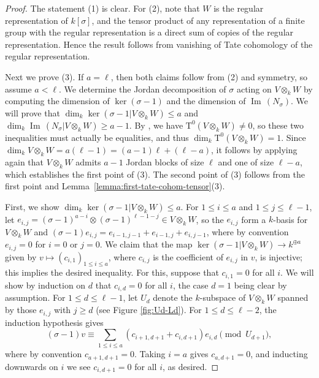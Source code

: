 \documentclass[reqno]{amsart}
\numberwithin{equation}{subsection}
\DeclareMathOperator{\Ima}{Im\,}
\newcommand{\rT}{\ensuremath{\mathrm{T}}\xspace}
\theoremstyle{remark}
\numberwithin{equation}{subsection}
\numberwithin{figure}{subsection}
\begin{document}
\begin{proof}
The statement (1) is clear. For (2), note that $W$ is the regular representation of $k[\sigma]$, and the tensor product of any representation of a finite group with the regular representation is a direct sum of copies of the regular representation. Hence the result follows from vanishing of Tate cohomology of the regular representation. 

Next we prove (3). If $a = \ell$, then both claims follow from (2) and symmetry, so assume $a < \ell$. We determine the Jordan decomposition of $\sigma$ acting on $V \otimes_k W$ by computing the dimension of $\ker(\sigma-1)$ and the dimension of $\Ima(N_\sigma)$. We will prove that $\dim_k \ker(\sigma-1| V \otimes_k W) \leq a$ and $\dim_k \Ima(N_\sigma|V \otimes_k W) \geq a-1$. By \cite[Lemma~3.1.3]{Cot26b}, we have $\rT^0(V \otimes_k W) \neq 0$, so these two inequalities must actually be equalities, and thus $\dim_k \rT^0(V \otimes_k W) = 1$. Since $\dim_k V \otimes_k W = a(\ell-1) = (a-1)\ell + (\ell-a)$, it follows by applying \cite[Lemma~3.1.3]{Cot26b} again that $V \otimes_k W$ admits $a-1$ Jordan blocks of size $\ell$ and one of size $\ell-a$, which establishes the first point of (3). The second point of (3) follows from the first point and Lemma~\ref{lemma:first-tate-cohom-tensor}(3).

First, we show $\dim_k \ker(\sigma-1| V \otimes_k W) \leq a$. For $1 \leq i \leq a$ and $1 \leq j \leq \ell-1$, let $e_{i,j} = (\sigma-1)^{a-i} \otimes (\sigma-1)^{\ell - 1-j} \in V \otimes_k W$, so the $e_{i,j}$ form a $k$-basis for $V \otimes_k W$ and $(\sigma - 1)e_{i,j} = e_{i-1,j-1} + e_{i-1,j} + e_{i,j-1}$, where by convention $e_{i,j} = 0$ for $i = 0$ or $j = 0$. We claim that the map $\ker(\sigma-1|V \otimes_k W) \to k^{\oplus a}$ given by $v \mapsto (c_{i,1})_{1 \leq i \leq a}$, where $c_{i,j}$ is the coefficient of $e_{i,j}$ in $v$, is injective; this implies the desired inequality. For this, suppose that $c_{i,1} = 0$ for all $i$. We will show by induction on $d$ that $c_{i,d} = 0$ for all $i$, the case $d=1$ being clear by assumption. For $1 \leq d \leq \ell - 1$, let $U_d$ denote the $k$-subspace of $V \otimes_k W$ spanned by those $e_{i,j}$ with $j \geq d$ (see Figure \ref{fig:Ud-Ld}). For $1 \leq d \leq \ell - 2$, the induction hypothesis gives
\[
(\sigma-1)v \equiv \sum_{1 \leq i \leq a} (c_{i+1,d+1} + c_{i,d+1})e_{i,d} \pmod{U_{d+1}},
\]
where by convention $c_{a+1,d+1} = 0$. Taking $i = a$ gives $c_{a,d+1} = 0$, and inducting downwards on $i$ we see $c_{i,d+1} = 0$ for all $i$, as desired. 


\end{proof}
\end{document}
